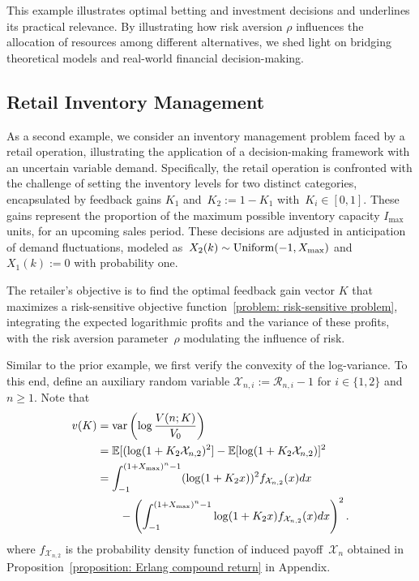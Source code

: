 \begin{remark} \rm
    This example illustrates optimal betting and investment decisions and underlines its practical relevance. By illustrating how risk aversion $\rho$ influences the allocation of resources among different alternatives, we shed light on bridging theoretical models and real-world financial decision-making.  
\end{remark}	


\subsection{Retail Inventory Management}  
   As a second example, we consider an inventory management problem faced by a retail operation, illustrating the application of a decision-making framework with an uncertain variable demand. 
    Specifically, the retail operation is confronted with the challenge of setting the inventory levels for two distinct categories, encapsulated by feedback gains $K_1$ and~$K_2:=1-K_1$ with~\(K_i \in [0, 1]\). These gains represent the proportion of the maximum possible inventory capacity \( I_{\max} \) units, for an upcoming sales period. These decisions are adjusted in anticipation of demand fluctuations, modeled as~$X_2(k) \sim {\rm Uniform}(-1, X_{\max})$ and $X_1(k) := 0$ with probability one. 
    
    The retailer's objective is to find the optimal feedback gain vector \(K\) that maximizes a risk-sensitive objective function~\eqref{problem: risk-sensitive problem}, integrating the expected logarithmic profits and the variance of these profits, with the risk aversion parameter~\( \rho \) modulating the influence of risk.

Similar to the prior example, we first verify the convexity of the log-variance. To this end, define an auxiliary random variable $\mathcal{X}_{n,i} := \mathcal{R}_{n,i} -1$ for $i \in \{1,2\}$ and $n\geq 1$. Note that
\begin{align*}
    v(K)
    &={\rm var}\left( \log \frac{V(n; K)}{V_0} \right) \\ 
     &= \mathbb{E}[(\log (1+K_2 \mathcal{X}_{n,2})^2] 
         - \mathbb{E}[\log (1+K_2 \mathcal{X}_{n,2})]^2\\
    & = \int_{-1}^{(1 + X_{\max})^n-1} (\log (1+K_2 x))^2 f_{\mathcal{X}_{n,2}} (x)dx \\
    &\qquad - \left( \int_{-1}^{(1+X_{\max})^n-1}  \log (1+K_2 x)f_{\mathcal{X}_{n,2}} (x)dx \right)^2.
\end{align*}
where $f_{\mathcal{X}_{n,2}}$ is the probability density function of induced payoff~$\mathcal{X}_n$ obtained in Proposition~\ref{proposition: Erlang compound return} in Appendix.

